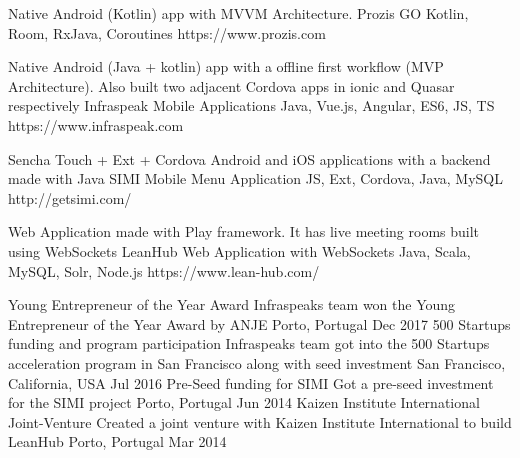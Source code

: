 \documentclass[]{awesome-cv}
\begin{document}
\vspace{-10mm}
\begin{cventries}
 	\cventry
	{Native Android (Kotlin) app with MVVM Architecture. }
	{Prozis GO}
	{Kotlin, Room, RxJava, Coroutines}
	{https://www.prozis.com}
	{}
	
	\vspace{-5mm}
	\cventry
	{Native Android (Java + kotlin) app with a offline first workflow (MVP Architecture). Also built two adjacent Cordova apps in ionic and Quasar respectively}
	{Infraspeak Mobile Applications}
	{Java, Vue.js, Angular, ES6, JS, TS}
	{https://www.infraspeak.com}
	{}
	
	\vspace{-5mm}
	\cventry
	{Sencha Touch + Ext + Cordova Android and iOS applications with a backend made with Java}
	{SIMI Mobile Menu Application}
	{JS, Ext, Cordova, Java, MySQL}
	{http://getsimi.com/}
	{}
	
	\vspace{-5mm}
	\cventry
	{Web Application made with Play framework. It has live meeting rooms built using WebSockets}
	{LeanHub Web Application with WebSockets}
	{Java, Scala, MySQL, Solr, Node.js}
	{https://www.lean-hub.com/}
	{}
	
	\vspace{-5mm}
\end{cventries}
\begin{cvhonors}
	\cvhonor
	{Young Entrepreneur of the Year Award}
	{Infraspeak\textquotesingle{}s team won the Young Entrepreneur of the Year Award by ANJE}
	{Porto, Portugal}
	{Dec 2017}
	\cvhonor
	{500 Startups funding and program participation}
	{Infraspeak\textquotesingle{}s team got into the 500 Startups acceleration program in San Francisco along with seed investment}
	{San Francisco, California, USA}
	{Jul 2016}
	\cvhonor
	{Pre-Seed funding for SIMI}
	{Got a pre-seed investment for the SIMI project}
	{Porto, Portugal}
	{Jun 2014}
	\cvhonor
	{Kaizen Institute International Joint-Venture}
	{Created a joint venture with Kaizen Institute International to build LeanHub}
	{Porto, Portugal}
	{Mar 2014}
\end{cvhonors}
\ 
\end{document}
